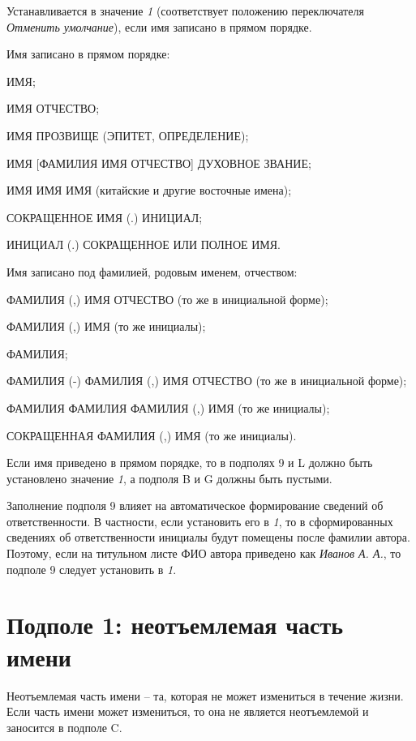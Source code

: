 Устанавливается в значение \emph{1} (соответствует положению переключателя \emph{Отменить умолчание}), если имя записано в прямом порядке.

Имя записано в прямом порядке:

\begin{cutelist}
    \item ИМЯ;
    \item ИМЯ ОТЧЕСТВО;
    \item ИМЯ ПРОЗВИЩЕ (ЭПИТЕТ, ОПРЕДЕЛЕНИЕ);
    \item ИМЯ [ФАМИЛИЯ ИМЯ ОТЧЕСТВО] ДУХОВНОЕ ЗВАНИЕ;
    \item ИМЯ ИМЯ ИМЯ (китайские и другие восточные имена);
    \item СОКРАЩЕННОЕ ИМЯ (.) ИНИЦИАЛ;
    \item ИНИЦИАЛ (.) СОКРАЩЕННОЕ ИЛИ ПОЛНОЕ ИМЯ.
\end{cutelist}

Имя записано под фамилией, родовым именем, отчеством:

\begin{cutelist}
    \item ФАМИЛИЯ (,) ИМЯ ОТЧЕСТВО (то же в инициальной форме);
    \item ФАМИЛИЯ (,) ИМЯ (то же инициалы);
    \item ФАМИЛИЯ;
    \item ФАМИЛИЯ (-) ФАМИЛИЯ (,) ИМЯ ОТЧЕСТВО (то же в инициальной форме);
    \item ФАМИЛИЯ ФАМИЛИЯ ФАМИЛИЯ (,) ИМЯ (то же инициалы);
    \item СОКРАЩЕННАЯ ФАМИЛИЯ (,) ИМЯ (то же инициалы).
\end{cutelist}

Если имя приведено в прямом порядке, то в подполях 9 и L должно быть установлено значение \emph{1}, а подполя B и G должны быть пустыми.

Заполнение подполя 9 влияет на автоматическое формирование сведений об ответственности. В частности, если установить его в \emph{1}, то в сформированных сведениях об ответственности инициалы будут помещены после фамилии автора. Поэтому, если на титульном листе ФИО автора приведено как \emph{Иванов А. А.}, то подполе 9 следует установить в \emph{1}.

\section{Подполе 1: неотъемлемая часть имени}

Неотъемлемая часть имени -- та, которая не может измениться в течение жизни. Если часть имени может измениться, то она не является неотъемлемой и заносится в подполе C.

